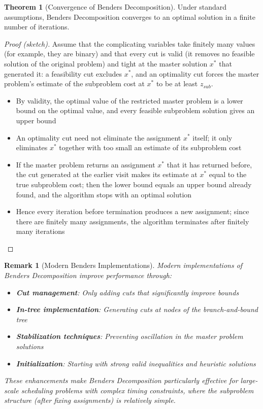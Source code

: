 \documentclass{article}
\newtheorem{remark}{Remark}
\theoremstyle{definition}
\newtheorem{theorem}{Theorem}
\begin{document}
\begin{theorem}[Convergence of Benders Decomposition]
Under standard assumptions, Benders Decomposition converges to an optimal solution in a finite number of iterations.

\begin{proof}[Proof (sketch)]
Assume that the complicating variables take finitely many values (for example, they are binary) and that every cut is valid (it removes no feasible solution of the original problem) and tight at the master solution $x^*$ that generated it: a feasibility cut excludes $x^*$, and an optimality cut forces the master problem's estimate of the subproblem cost at $x^*$ to be at least $z_{sub}$.
\begin{itemize}
    \item By validity, the optimal value of the restricted master problem is a lower bound on the optimal value, and every feasible subproblem solution gives an upper bound
    \item An optimality cut need not eliminate the assignment $x^*$ itself; it only eliminates $x^*$ together with too small an estimate of its subproblem cost
    \item If the master problem returns an assignment $x^*$ that it has returned before, the cut generated at the earlier visit makes its estimate at $x^*$ equal to the true subproblem cost; then the lower bound equals an upper bound already found, and the algorithm stops with an optimal solution
    \item Hence every iteration before termination produces a new assignment; since there are finitely many assignments, the algorithm terminates after finitely many iterations
\end{itemize}
\end{proof}
\end{theorem}

\begin{remark}[Modern Benders Implementations]
Modern implementations of Benders Decomposition improve performance through:
\begin{itemize}
    \item \textbf{Cut management}: Only adding cuts that significantly improve bounds
    \item \textbf{In-tree implementation}: Generating cuts at nodes of the branch-and-bound tree
    \item \textbf{Stabilization techniques}: Preventing oscillation in the master problem solutions
    \item \textbf{Initialization}: Starting with strong valid inequalities and heuristic solutions
\end{itemize}

These enhancements make Benders Decomposition particularly effective for large-scale scheduling problems with complex timing constraints, where the subproblem structure (after fixing assignments) is relatively simple.
\end{remark}
\end{document}
